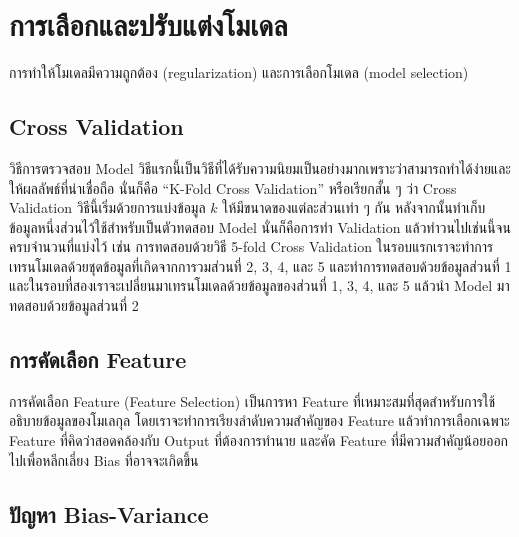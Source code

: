 

\chapter{การเลือกและปรับแต่งโมเดล}
\label{ch:reg_sel_model}

การทำให้โมเดลมีความถูกต้อง (regularization) และการเลือกโมเดล (model selection)

\section{Cross Validation}

วิธีการตรวจสอบ Model วิธีแรกนี้เป็นวิธีที่ได้รับความนิยมเป็นอย่างมากเพราะว่าสามารถทำได้ง่ายและให้ผลลัพธ์ที่น่าเชื่อถือ นั่นก็คือ \enquote{K-Fold Cross Validation}
หรือเรียกสั้น ๆ ว่า Cross Validation วิธีนี้เริ่มด้วยการแบ่งข้อมูล $k$ ให้มีขนาดของแต่ละส่วนเท่า ๆ กัน หลังจากนั้นทำเก็บข้อมูลหนึ่งส่วนไว้ใช้สำหรับเป็นตัวทดสอบ Model 
นั่นก็คือการทำ Validation แล้วทําวนไปเช่นนี้จนครบจํานวนที่แบ่งไว้ เช่น การทดสอบด้วยวิธี 5-fold Cross Validation
ในรอบแรกเราจะทำการเทรนโมเดลด้วยชุดข้อมูลที่เกิดจากการวมส่วนที่ 2, 3, 4, และ 5 และทำการทดสอบด้วยข้อมูลส่วนที่ 1 
และในรอบที่สองเราจะเปลี่ยนมาเทรนโมเดลด้วยข้อมูลของส่วนที่ 1, 3, 4, และ 5 แล้วนำ Model มาทดสอบด้วยข้อมูลส่วนที่ 2

\section{การคัดเลือก Feature}

การคัดเลือก Feature (Feature Selection) เป็นการหา Feature ที่เหมาะสมที่สุดสำหรับการใช้อธิบายข้อมูลของโมเลกุล โดยเราจะทำการเรียงลำดับความสำคัญของ Feature 
แล้วทำการเลือกเฉพาะ Feature ที่คิดว่าสอดคล้องกับ Output ที่ต้องการทำนาย และคัด Feature ที่มีความสำคัญน้อยออกไปเพื่อหลีกเลี่ยง Bias ที่อาจจะเกิดขึ้น

\section{ปัญหา Bias-Variance}

